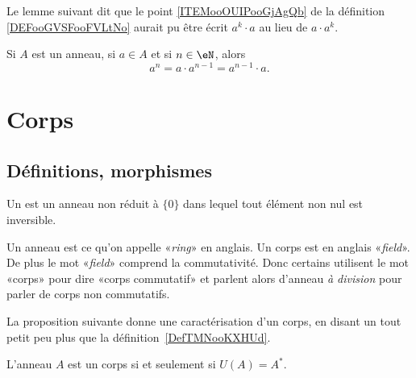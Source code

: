 Le lemme suivant dit que le point \ref{ITEMooOUIPooGjAgQb} de la définition \ref{DEFooGVSFooFVLtNo} aurait pu être écrit \( a^k\cdot a\) au lieu de \( a\cdot a^k\).
\begin{lemma}        \label{LEMooWPARooYLZlzr}
    Si \( A\) est un anneau, si \( a\in A\) et si \( n\in \eN\), alors
    \begin{equation}
        a^n=a\cdot a^{n-1}=a^{n-1}\cdot a.
    \end{equation}
\end{lemma}


\section{Corps}

\subsection{Définitions, morphismes}

\begin{definition}  \label{DefTMNooKXHUd}
    Un  est un anneau non réduit à \( \{ 0 \}\) dans lequel tout élément non nul est inversible.
\end{definition}

\begin{remark}      \label{REMooYRNUooYgBBKF}
    Un anneau est ce qu'on appelle «\emph{ring}» en anglais. Un corps est en anglais «\emph{field}». De plus le mot «\emph{field}» comprend la commutativité. Donc certains utilisent le mot «corps» pour dire «corps commutatif» et parlent alors d'anneau \emph{à division} pour parler de corps non commutatifs.
\end{remark}

La proposition suivante donne une caractérisation d'un corps, en disant un tout petit peu plus que la définition~\ref{DefTMNooKXHUd}.
\begin{proposition}
    L'anneau $A$ est un corps si et seulement si \( U(A) = A^* \).
\end{proposition}

